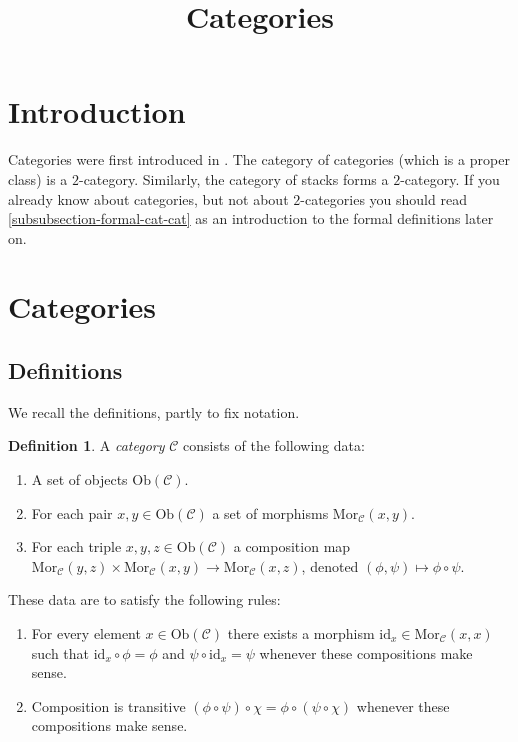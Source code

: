 \documentclass{amsart}
\theoremstyle{definition}
\newtheorem{definition}[theorem]{Definition}
\theoremstyle{remark}
\numberwithin{equation}{subsection}
\begin{document}
\title{Categories}


\maketitle
\thispagestyle{fancy}

\tableofcontents
\section{Introduction}
\label{section-introduction}

\noindent
Categories were first introduced in \cite{GenEqui}.
The category of categories (which is a proper class)
is a $2$-category. Similarly, the category of stacks
forms a $2$-category. If you already know
about categories, but not about $2$-categories you
should read \ref{subsubsection-formal-cat-cat} as
an introduction to the formal definitions later on.

\section{Categories}
\label{section-categories}

\subsection{Definitions}
\label{subsection-definition-categories}

\noindent
We recall the definitions, partly to fix notation.

\begin{definition}
\label{definition-category}
A {\it category} $\mathcal{C}$ consists of the following data:
\begin{enumerate}
\item A set of objects $\text{Ob}(\mathcal{C})$.
\item For each pair $x,y \in \text{Ob}(\mathcal{C})$ a set of morphisms
$\text{Mor}_\mathcal{C}(x,y)$.
\item For each triple $x,y,z\in \text{Ob}(\mathcal{C})$ a composition
map $ \text{Mor}_\mathcal{C}(y,z) \times \text{Mor}_\mathcal{C}(x,y) 
\to \text{Mor}_\mathcal{C}(x,z) $, denoted $(\phi, \psi) \mapsto 
\phi \circ \psi$.
\end{enumerate}
These data are to satisfy the following rules:
\begin{enumerate}
\item For every element $x\in \text{Ob}(\mathcal{C})$ there exists a
morphism $\text{id}_x\in \text{Mor}_\mathcal{C}(x,x)$ such that 
$\text{id}_x \circ \phi = \phi$ and $\psi \circ \text{id}_x = \psi $ whenever
these compositions make sense.
\item Composition is transitive $(\phi \circ \psi) \circ \chi =
\phi \circ ( \psi \circ \chi)$ whenever these compositions make sense.
\end{enumerate}
\end{definition}
\end{document}
